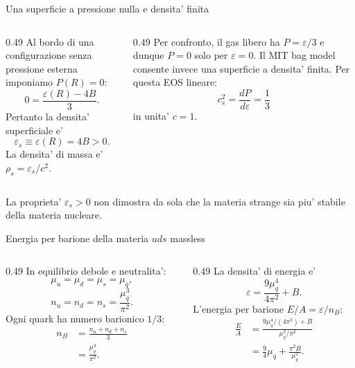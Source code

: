 \begin{frame}{Una superficie a pressione nulla e densita' finita}
\small
\begin{columns}[T,onlytextwidth]
\begin{column}{0.49\textwidth}
Al bordo di una configurazione senza
pressione esterna imponiamo $P(R)=0$:
\[
0=\frac{\varepsilon(R)-4B}{3}.
\]
Pertanto la densita' superficiale e'
\[
\varepsilon_s\equiv\varepsilon(R)=4B>0.
\]
La densita' di massa e' $\rho_s=\varepsilon_s/c^2$.
\end{column}
\begin{column}{0.49\textwidth}
Per confronto, il gas libero ha
$P=\varepsilon/3$ e dunque $P=0$
solo per $\varepsilon=0$.
\medskip
Il MIT bag model consente invece
una superficie a densita' finita.
\medskip
Per questa EOS lineare:
\[
c_s^2=\frac{dP}{d\varepsilon}=\frac13
\]
in unita' $c=1$.
\end{column}
\end{columns}
\medskip
La proprieta' $\varepsilon_s>0$ non dimostra da sola che la materia
strange sia piu' stabile della materia nucleare.
\end{frame}

\begin{frame}{Energia per barione della materia $uds$ massless}
\small
\begin{columns}[T,onlytextwidth]
\begin{column}{0.49\textwidth}
In equilibrio debole e neutralita':
\[
\mu_u=\mu_d=\mu_s=\mu_q,
\]
\[
n_u=n_d=n_s=\frac{\mu_q^3}{\pi^2}.
\]
Ogni quark ha numero barionico $1/3$:
\begin{align*}
n_B&=\frac{n_u+n_d+n_s}{3}\\
&=\frac{\mu_q^3}{\pi^2}.
\end{align*}
\end{column}
\begin{column}{0.49\textwidth}
La densita' di energia e'
\[
\varepsilon=\frac{9\mu_q^4}{4\pi^2}+B.
\]
L'energia per barione $E/A=\varepsilon/n_B$:
\begin{align*}
\frac EA&=\frac{9\mu_q^4/(4\pi^2)+B}
{\mu_q^3/\pi^2}\\
&=\frac94\mu_q+\frac{\pi^2B}{\mu_q^3}.
\end{align*}
\end{column}
\end{columns}
\end{frame}

